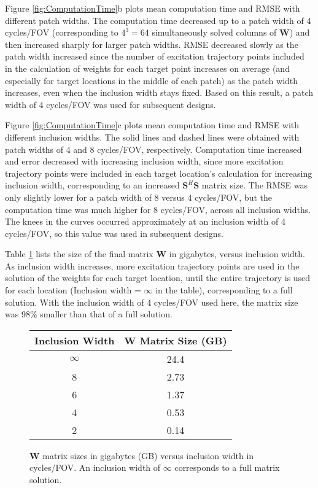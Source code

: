 \par Figure \ref{fig:ComputationTime}b plots mean computation time and RMSE with different patch widths. 
The computation time decreased up to a patch width of 4 cycles/FOV (corresponding to $4^3 = 64$ simultaneously solved columns of $\bm{W}$) 
and then increased sharply for larger patch widths. 
RMSE decreased slowly as the patch width increased since the number of excitation trajectory points included in the calculation of weights for each 
target point increases on average (and especially for target locations in the middle of each patch) as the patch width increases, 
even when the inclusion width stays fixed.
Based on this result, a patch width of 4 cycles/FOV was used for subsequent designs.

\par Figure \ref{fig:ComputationTime}c plots mean computation time and RMSE with different inclusion widths. 
The solid lines and dashed lines were obtained with patch widths of 4 and 8 cycles/FOV, respectively. 
Computation time increased and error decreased with increasing inclusion width,
since more excitation trajectory points were included in each target location's calculation for increasing inclusion width,
corresponding to an increased $\bm{S}^H\bm{S}$ matrix size. 
The RMSE was only slightly lower for a patch width of 8 versus 4 cycles/FOV, 
but the computation time was much higher for 8 cycles/FOV, across all inclusion widths. 
The knees in the curves occurred approximately at an inclusion width of 4 cycles/FOV,
so this value was used in subsequent designs. 

\par Table \ref{fig:wsize} lists the size of the final matrix $\bm{W}$ in gigabytes,
versus inclusion width.
As inclusion width increases, more excitation trajectory points are used in the solution of the weights for each target location,
until the entire trajectory is used for each location (Inclusion width = $\infty$ in the table),
corresponding to a full solution. 
With the inclusion width of 4 cycles/FOV used here, 
the matrix size was 98\% smaller than that of a full solution.  

\begin{figure}
\centering
\begin{tabular}{c | c}
Inclusion Width & $\bm{W}$ Matrix Size (GB) \\
\hline
$\infty$ & 24.4 \\
8 & 2.73 \\
6 & 1.37 \\
4 & 0.53 \\
2 & 0.14
\end{tabular}
\caption{$\bm{W}$ matrix sizes in gigabytes (GB) versus inclusion width in cycles/FOV. 
An inclusion width of $\infty$ corresponds to a full matrix solution.}
\label{fig:wsize}
\end{figure}

